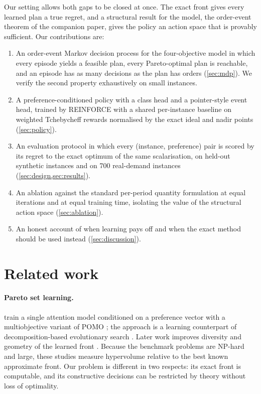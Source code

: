 \documentclass[preprint,12pt,authoryear]{elsarticle}
\begin{document}
Our setting allows both gaps to be closed at once. The exact front gives every learned plan a true
regret, and a structural result for the model, the order-event theorem of the companion paper,
gives the policy an action space that is provably sufficient. Our contributions are:
\begin{enumerate}
\item An order-event Markov decision process for the four-objective model in which every
episode yields a feasible plan, every Pareto-optimal plan is reachable, and an episode has as many
decisions as the plan has orders (\cref{sec:mdp}). We verify the second property exhaustively on
small instances.
\item A preference-conditioned policy with a class head and a pointer-style event head, trained by
REINFORCE with a shared per-instance baseline on weighted Tchebycheff rewards normalised by the
exact ideal and nadir points (\cref{sec:policy}).
\item An evaluation protocol in which every (instance, preference) pair is scored by its regret
to the exact optimum of the same scalarisation, on held-out synthetic instances and on 700
real-demand instances (\cref{sec:design,sec:results}).
\item An ablation against the standard per-period quantity formulation at equal iterations and at
equal training time, isolating the value of the structural action space (\cref{sec:ablation}).
\item An honest account of when learning pays off and when the exact method should be used
instead (\cref{sec:discussion}).
\end{enumerate}

\section{Related work}\label{sec:related}

\paragraph{Pareto set learning.}
\citet{Lin2022PSL} train a single attention model conditioned on a preference vector with a
multiobjective variant of POMO \citep{Kwon2020POMO}; the approach is a learning counterpart of
decomposition-based evolutionary search \citep{ZhangLi2007MOEAD}. Later work improves diversity
and geometry of the learned front \citep{Chen2023NHDE,Lu2024GAPL}. Because the benchmark problems
are NP-hard and large, these studies measure hypervolume relative to the best known approximate
front. Our problem is different in two respects: its exact front is computable, and its
constructive decisions can be restricted by theory without loss of optimality.
\end{document}

